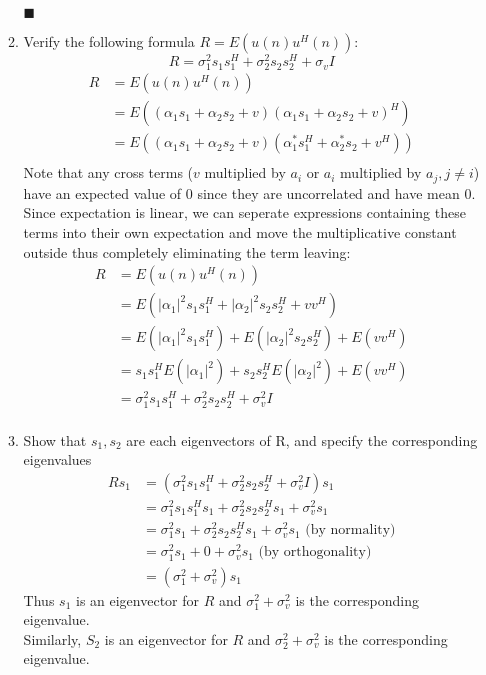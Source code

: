 \documentclass[12pt]{article}
\begin{document}
\begin{enumerate}
\begin{enumerate}
$\blacksquare$
\item Verify the following formula $R = E(u(n)u^H(n))$:\\
$$R = \sigma_1^2s_1s_1^H + \sigma_2^2s_2s_2^H + \sigma_v I$$
\begin{align*}
R &= E(u(n)u^H(n))\\
&= E( (\alpha_1s_1+\alpha_2s_2+v)(\alpha_1s_1+\alpha_2s_2+v)^H )\\
&= E( (\alpha_1s_1+\alpha_2s_2+v)(\alpha_1^*s_1^H+\alpha_2^*s_2+v^H) )\\
\end{align*}
Note that any cross terms ($v$ multiplied by $a_i$ or $a_i$ multiplied by $a_j,j\neq i$)
have an expected value of $0$ since they are uncorrelated and have mean $0$.  Since expectation is linear, we can seperate expressions containing these terms into their own expectation and move the multiplicative constant outside thus completely eliminating the term leaving:
\begin{align*}
R &= E(u(n)u^H(n))\\
&= E(|\alpha_1|^2 s_1s_1^H + |\alpha_2|^2s_2s_2^H + vv^H)\\
&= E(|\alpha_1|^2 s_1s_1^H) + E(|\alpha_2|^2s_2s_2^H) + E(vv^H)\\
&= s_1s_1^HE(|\alpha_1|^2 ) + s_2s_2^HE(|\alpha_2|^2) + E(vv^H)\\
&= \sigma_1^2s_1s_1^H + \sigma_2^2s_2s_2^H + \sigma_v^2 I\\
\end{align*}
\item Show that $s_1,s_2$ are each eigenvectors of R, and specify the corresponding eigenvalues\\
\begin{align*}
Rs_1 &= (\sigma_1^2s_1s_1^H + \sigma_2^2s_2s_2^H + \sigma_v^2 I)s_1\\
&= \sigma_1^2s_1s_1^Hs_1 + \sigma_2^2s_2s_2^Hs_1 + \sigma_v^2 s_1\\
&= \sigma_1^2s_1 + \sigma_2^2s_2s_2^Hs_1 + \sigma_v^2 s_1 \text{ (by normality)}\\
&= \sigma_1^2s_1 + 0 + \sigma_v^2 s_1 \text{ (by orthogonality)}\\
&= (\sigma_1^2 + \sigma_v^2)s_1
\end{align*}
Thus $s_1$ is an eigenvector for $R$ and $\sigma_1^2+\sigma_v^2$ is the corresponding eigenvalue.\\
Similarly, $S_2$ is an eigenvector for $R$ and $\sigma_2^2+\sigma_v^2$ is the corresponding eigenvalue.\\

\end{enumerate}
\end{enumerate}
\end{document}
